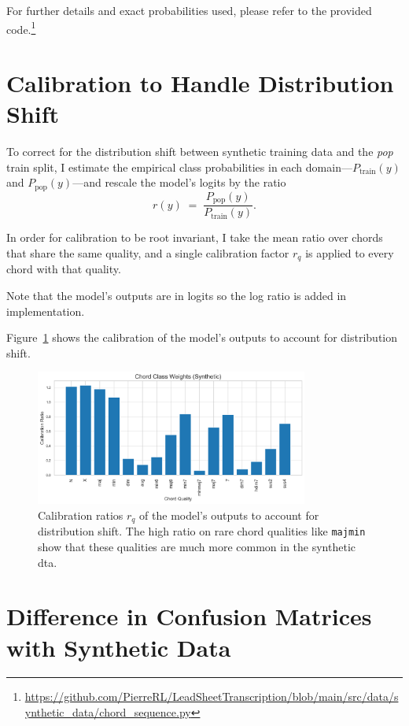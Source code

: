 For further details and exact probabilities used, please refer to the provided code.\footnote{\url{https://github.com/PierreRL/LeadSheetTranscription/blob/main/src/data/synthetic_data/chord_sequence.py}}

\section{Calibration to Handle Distribution Shift}\label{app:calibration}

To correct for the distribution shift between synthetic training data and the \emph{pop} train split, I estimate the empirical class probabilities in each domain---\(P_{\text{train}}(y)\) and \(P_{\text{pop}}(y)\)---and rescale the model’s logits by the ratio
\begin{equation}
r(y)\;=\;\frac{P_{\text{pop}}(y)}{P_{\text{train}}(y)}.
\end{equation}

In order for calibration to be root invariant, I take the mean ratio over chords that share the same quality, and a single calibration factor \(r_q\) is applied to every chord with that quality.

Note that the model's outputs are in logits so the log ratio is added in implementation.

Figure~\ref{fig:calibration} shows the calibration of the model's outputs to account for distribution shift.

\begin{figure}[H]
    \centering
    \includegraphics[width=0.8\textwidth]{figures/calibration_ratios.png}
    \caption{Calibration ratios $r_q$ of the model's outputs to account for distribution shift. The high ratio on rare chord qualities like \texttt{majmin} show that these qualities are much more common in the synthetic dta.}\label{fig:calibration}
\end{figure}

\section{Difference in Confusion Matrices with Synthetic Data}\label{app:cm_synthetic_data}

